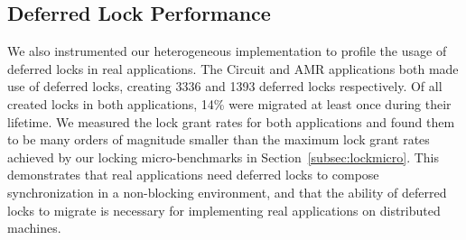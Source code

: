 \subsection{Deferred Lock Performance}
\label{subsec:lockmig}
We also instrumented our heterogeneous implementation to profile
the usage of deferred locks in real applications.  The Circuit and AMR 
applications both made use of deferred locks, creating 3336 and 1393 
deferred locks respectively.  Of all created locks in both applications, 
14\% were migrated at least once during their lifetime.  We measured the 
lock grant rates for both applications and found them to be many orders of magnitude smaller
than the maximum lock grant rates achieved by our locking micro-benchmarks
in Section~\ref{subsec:lockmicro}.  This demonstrates that real applications need deferred
locks to compose synchronization in a non-blocking environment, and that the
ability of deferred locks to migrate is necessary for implementing real applications
on distributed machines.



